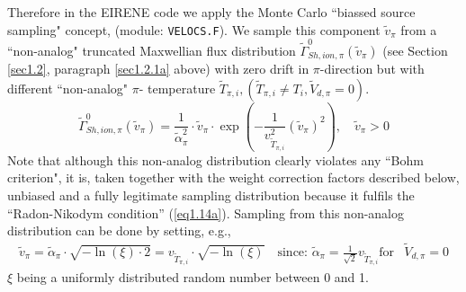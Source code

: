 Therefore in the EIRENE code we apply the Monte Carlo  ``biassed source sampling" concept, (module: \texttt{VELOCS.F}).
We sample this component
${\tilde{v} }_{\pi}$ from a ``non-analog" truncated Maxwellian flux distribution
$\tilde\Gamma^0_{Sh,ion,\pi}(\tilde v_{\pi})$ (see Section \ref{sec1.2}, paragraph \ref{sec1.2.1a} above)
with zero drift in $\pi$-direction but with different ``non-analog" $\pi$- temperature ${\tilde{T}}_{\pi,i},
({\tilde{T}}_{\pi,i}   \ne T_i   , {\tilde{V}} _{d,\pi} = 0 )$.
\begin{equation}
\tilde\Gamma^0_{Sh,ion,\pi}(\tilde v_\pi)   = \frac{1}{\tilde \alpha^2_\pi}   \cdot   \tilde v_{\pi}   \cdot
  \exp \left ( - \frac{1}{v_{\tilde T_{\pi,i}}^2}
(\tilde v_\pi )^2  \right )    , \quad
\tilde v_{\pi} > 0
\end{equation}
Note that although this non-analog
distribution clearly violates any ``Bohm criterion", it is, taken together with the weight correction factors described below, unbiased and
a fully legitimate sampling distribution because it fulfils the ``Radon-Nikodym condition''
(\ref{eq1.14a}).
Sampling from this non-analog distribution can
be done by setting, e.g.,
\begin{eqnarray}
\tilde{v}_{\pi}   = {\tilde{\alpha}}_{\pi}   \cdot   \sqrt{ -\ln(
\xi )  \cdot 2 } = v_{\tilde T_{\pi,i}} \cdot   \sqrt{ -\ln(
\xi ) }  \quad  \mbox{since: \ }  \tilde{\alpha}_{\pi}   =\frac{1}{\sqrt{2}}
v_{\tilde T_{\pi,i}}  \mbox{for} & \tilde{V}_{d,\pi} = 0
\label{eq1.26}
\end{eqnarray}
$\xi$  being a uniformly distributed random number between 0 and
1.

\smallskip\noindent

